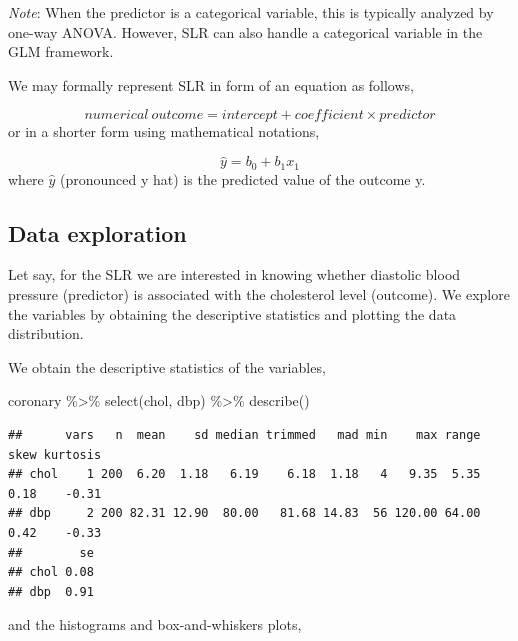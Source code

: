\documentclass[
  10pt,
]{krantz}
\newenvironment{Shaded}{\begin{snugshade}}{\end{snugshade}}
\newcommand{\FunctionTok}[1]{\textcolor[rgb]{0.00,0.00,0.00}{#1}}
\newcommand{\NormalTok}[1]{#1}
\newcommand{\SpecialCharTok}[1]{\textcolor[rgb]{0.00,0.00,0.00}{#1}}
\begin{document}
\emph{Note}: When the predictor is a categorical variable, this is typically analyzed by one-way ANOVA. However, SLR can also handle a categorical variable in the GLM framework.

We may formally represent SLR in form of an equation as follows,

\[numerical\ outcome = intercept + coefficient \times predictor\]
or in a shorter form using mathematical notations,

\[\hat y = b_0 + b_1x_1\]
where \(\hat y\) (pronounced y hat) is the predicted value of the outcome y.

\hypertarget{data-exploration}{%
\subsection{Data exploration}\label{data-exploration}}

Let say, for the SLR we are interested in knowing whether diastolic blood pressure (predictor) is associated with the cholesterol level (outcome). We explore the variables by obtaining the descriptive statistics and plotting the data distribution.

We obtain the descriptive statistics of the variables,

\begin{Shaded}
\begin{Highlighting}[]
\NormalTok{coronary }\SpecialCharTok{\%\textgreater{}\%} \FunctionTok{select}\NormalTok{(chol, dbp) }\SpecialCharTok{\%\textgreater{}\%} \FunctionTok{describe}\NormalTok{()}
\end{Highlighting}
\end{Shaded}

\begin{verbatim}
##      vars   n  mean    sd median trimmed   mad min    max range skew kurtosis
## chol    1 200  6.20  1.18   6.19    6.18  1.18   4   9.35  5.35 0.18    -0.31
## dbp     2 200 82.31 12.90  80.00   81.68 14.83  56 120.00 64.00 0.42    -0.33
##        se
## chol 0.08
## dbp  0.91
\end{verbatim}

and the histograms and box-and-whiskers plots,
\end{document}
